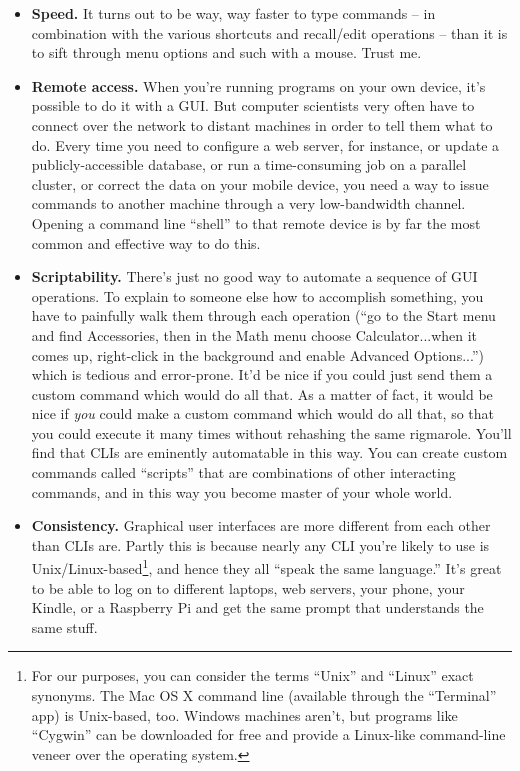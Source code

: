 \begin{itemize}
\itemsep.1em

\item \textbf{Speed.} It turns out to be way, way faster to type commands --
in combination with the various shortcuts and recall/edit operations -- than
it is to sift through menu options and such with a mouse. Trust me.

\item \textbf{Remote access.} When you're running programs on your own device,
it's possible to do it with a GUI. But computer scientists very often have to
connect over the network to distant machines in order to tell them what to do.
Every time you need to configure a web server, for instance, or update a
publicly-accessible database, or run a time-consuming job on a parallel
cluster, or correct the data on your mobile device, you need a way to issue
commands to another machine through a very low-bandwidth channel. Opening a
command line ``shell'' to that remote device is by far the most common and
effective way to do this.

\item \textbf{Scriptability.} There's just no good way to automate a sequence
of GUI operations. To explain to someone else how to accomplish something, you
have to painfully walk them through each operation (``go to the Start menu and
find Accessories, then in the Math menu choose Calculator...when it comes up,
right-click in the background and enable Advanced Options...'') which is
tedious and error-prone. It'd be nice if you could just send them a custom
command which would do all that. As a matter of fact, it would be nice if
\textit{you} could make a custom command which would do all that, so that you
could execute it many times without rehashing the same rigmarole. You'll find
that CLIs are eminently automatable in this way. You can create custom
commands called ``scripts'' that are combinations of other interacting
commands, and in this way you become master of your whole world.

\item \textbf{Consistency.} Graphical user interfaces are more different from
each other than CLIs are. Partly this is because nearly any CLI you're likely
to use is Unix/Linux-based\footnote{For our purposes, you can consider the
terms ``Unix'' and ``Linux'' exact synonyms. The Mac OS X command line
(available through the ``Terminal'' app) is Unix-based, too. Windows machines
aren't, but programs like ``Cygwin'' can be downloaded for free and provide a
Linux-like command-line veneer over the operating system.}, and hence they all
``speak the same language.'' It's great to be able to log on to different
laptops, web servers, your phone, your Kindle, or a Raspberry Pi and get the
same prompt that understands the same stuff.


\end{itemize}
